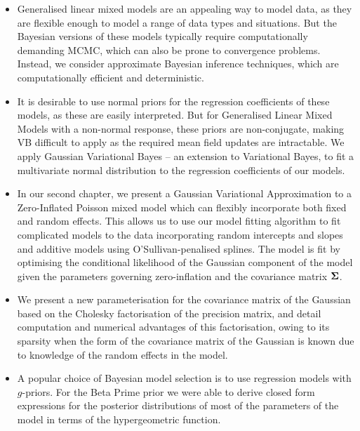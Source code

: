 \begin{itemize}

\item Generalised linear mixed models are an appealing way to model data, as
they are flexible enough to model a range of data types and situations. But the
Bayesian versions of these models typically require computationally demanding
MCMC, which can also be prone to convergence problems. Instead, we consider
approximate Bayesian inference techniques, which are computationally efficient
and deterministic.

\item It is desirable to use normal priors for the regression coefficients of
these models, as these are easily interpreted. But for Generalised Linear Mixed
Models with a non-normal response, these priors are non-conjugate, making VB
difficult to apply as the required mean field updates are intractable. We apply
Gaussian Variational Bayes -- an extension to Variational Bayes, to fit a
multivariate normal distribution to the regression coefficients of our models.

\item In our second chapter, we present a Gaussian Variational Approximation to
a Zero-Inflated Poisson mixed model which can flexibly incorporate both fixed
and random effects. This allows us to use our model fitting algorithm to fit
complicated models to the data incorporating random intercepts and slopes and
additive models using O'Sullivan-penalised splines.  The model is fit by
optimising the conditional likelihood of the Gaussian component of the model
given the parameters governing zero-inflation and the covariance matrix
${\boldsymbol \Sigma}$.

\item We present a new parameterisation for the covariance matrix of the
Gaussian based on the Cholesky factorisation of the precision matrix, and detail
computation and numerical advantages of this factorisation, owing to its
sparsity when the form of the covariance matrix of the Gaussian is known due to
knowledge of the random effects in the model.


\item A popular choice of Bayesian model selection is to use regression models
with $g$-priors. For the Beta Prime prior \citep{Maruyama2011} we were able to
derive closed form expressions for the posterior distributions of most of the
parameters of the model in terms of the hypergeometric function.


\end{itemize}

